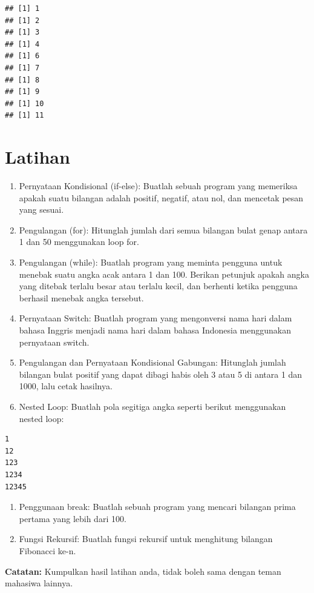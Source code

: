\documentclass[
]{book}
\begin{document}
\begin{verbatim}
## [1] 1
## [1] 2
## [1] 3
## [1] 4
## [1] 6
## [1] 7
## [1] 8
## [1] 9
## [1] 10
## [1] 11
\end{verbatim}

\hypertarget{latihan-4}{%
\section{Latihan}\label{latihan-4}}

\begin{enumerate}
\def\labelenumi{\arabic{enumi}.}
\item
  Pernyataan Kondisional (if-else):
  Buatlah sebuah program yang memeriksa apakah suatu bilangan adalah positif, negatif, atau nol, dan mencetak pesan yang sesuai.
\item
  Pengulangan (for):
  Hitunglah jumlah dari semua bilangan bulat genap antara 1 dan 50 menggunakan loop for.
\item
  Pengulangan (while):
  Buatlah program yang meminta pengguna untuk menebak suatu angka acak antara 1 dan 100. Berikan petunjuk apakah angka yang ditebak terlalu besar atau terlalu kecil, dan berhenti ketika pengguna berhasil menebak angka tersebut.
\item
  Pernyataan Switch:
  Buatlah program yang mengonversi nama hari dalam bahasa Inggris menjadi nama hari dalam bahasa Indonesia menggunakan pernyataan switch.
\item
  Pengulangan dan Pernyataan Kondisional Gabungan:
  Hitunglah jumlah bilangan bulat positif yang dapat dibagi habis oleh 3 atau 5 di antara 1 dan 1000, lalu cetak hasilnya.
\item
  Nested Loop:
  Buatlah pola segitiga angka seperti berikut menggunakan nested loop:
\end{enumerate}

\begin{verbatim}
1
12
123
1234
12345
\end{verbatim}

\begin{enumerate}
\def\labelenumi{\arabic{enumi}.}
\setcounter{enumi}{6}
\item
  Penggunaan break:
  Buatlah sebuah program yang mencari bilangan prima pertama yang lebih dari 100.
\item
  Fungsi Rekursif:
  Buatlah fungsi rekursif untuk menghitung bilangan Fibonacci ke-n.
\end{enumerate}

\textbf{Catatan:} Kumpulkan hasil latihan anda, tidak boleh sama dengan teman mahasiwa lainnya.
\end{document}
